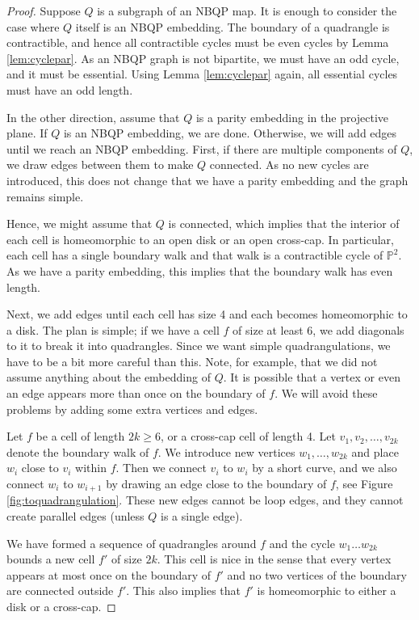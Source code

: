\documentclass[10pt,a4paper]{article}
\newcommand{\Pb}[0]{\mathbb{P}}
\begin{document}
\begin{proof}
    Suppose $Q$ is a subgraph of an NBQP map. It is enough to consider the case where $Q$ itself is an NBQP embedding. The boundary of a quadrangle is contractible, and hence all contractible cycles must be even cycles by Lemma \ref{lem:cyclepar}. As an NBQP graph is not bipartite, we must have an odd cycle, and it must be essential. Using Lemma \ref{lem:cyclepar} again, all essential cycles must have an odd length.   

    In the other direction, assume that $Q$ is a parity embedding in the projective plane. If $Q$ is an NBQP embedding, we are done. Otherwise, we will add edges until we reach an NBQP embedding. First, if there are multiple components of $Q$, we draw edges between them to make  $Q$ connected. As no new cycles are introduced, this does not change that we have a parity embedding and the graph remains simple. 

    Hence, we might assume that $Q$ is connected, which implies that the interior of each cell is homeomorphic to an open disk or an open cross-cap.  In particular, each cell has a single boundary walk and that walk is a contractible cycle of $\Pb^2$. As we have a parity embedding, this implies that the boundary walk has even length. 

    Next, we add edges until each cell has size 4 and each becomes homeomorphic to a disk. The plan is simple; if we have a cell $f$ of size at least 6, we add diagonals to it to break it into quadrangles. Since we want simple quadrangulations, we have to be a bit more careful than this. Note, for example, that we did not assume anything about the embedding of $Q$. It is possible that a vertex or even an edge appears more than once on the boundary of $f$. We will avoid these problems by adding some extra vertices and edges. 
    
    Let $f$ be a cell of length $2k\ge 6$, or a cross-cap cell of length 4. Let $v_1,v_2,\dots, v_{2k}$ denote the boundary walk of $f$. We introduce new vertices $w_1,\dots, w_{2k}$ and place $w_i$ close to $v_i$ within $f$. Then we connect $v_i$ to $w_i$ by a short curve, and we also connect $w_i$ to $w_{i+1}$ by drawing an edge close to the boundary of $f$, see Figure \ref{fig:toquadrangulation}. These new edges cannot be loop edges, and they cannot create parallel edges (unless $Q$ is a single edge). 

    We have formed a sequence of quadrangles around $f$ and the cycle $w_1\dots w_{2k}$ bounds a new cell $f'$ of size $2k$. This cell is nice in the sense that every vertex appears at most once on the boundary of $f'$ and no two vertices of the boundary are connected outside $f'$. This also implies that $f'$ is homeomorphic to either a disk or a cross-cap. 


\end{proof}
\end{document}
